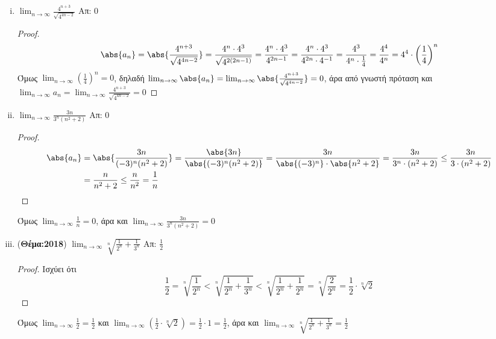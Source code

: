 \begin{enumerate}
\begin{enumerate}[i)]
            \item $ \lim_{n \to \infty} \frac{4^{n+3}}{\sqrt{4^{4n-2}}} $ \hfill Απ: 0  
                \begin{proof}
                    \[
                        \abs{a_{n}} = \abs{\frac{4^{n+3}}{\sqrt{4^{4n-2}}}} = 
                        \frac{4^{n}\cdot 4^{3}}{\sqrt{4^{2(2n-1)}}} = 
                        \frac{4^{n} \cdot 4^{3}}{4^{2n-1}} = 
                        \frac{4^{n}\cdot 4^{3}}{4^{2n}\cdot 4^{-1}} = 
                        \frac{4^{3}}{4^{n}\cdot 
                        \frac{1}{4}} = \frac{4^{4}}{4^{n}} = 4^{4}\cdot 
                        \left(\frac{1}{4} \right) ^{n}
                    \] 
                    Όμως $ \lim_{n \to \infty} \left(\frac{1}{4}\right)^{n} = 0  $, 
                    δηλαδή $ \lim_{n \to \infty} \abs{a_{n}} = \lim_{n \to \infty}
                    \abs{\frac{4^{n+3}}{\sqrt{4^{4n-2}}}} = 0 $, άρα από γνωστή 
                    πρόταση και $ \lim_{n \to \infty} a_{n} =  \lim_{n \to \infty} 
                    \frac{4^{n+3}}{\sqrt{4^{4n-2}}} = 0 $ 
                \end{proof}

            \item $ \lim_{n \to \infty} \frac{3n}{3^{n}(n^{2}+2)} $ \hfill Απ: 0  
                \begin{proof}
                    \begin{align*}
                        \abs{a_{n}} 
               &= \abs{\frac{3n}{(-3)^{n}(n^{2}+2)}} =
               \frac{\abs{3n}}{\abs{(-3)^{n}(n^{2}+2)}} = \frac{3n}{\abs{(-3)^{n}} \cdot
               \abs{n^{2}+2} } = \frac{3n}{3^{n}\cdot (n^{2}+2)} \leq 
               \frac{3n}{3\cdot (n^{2}+2)} \\ 
               &= \frac{n}{n^{2}+2} \leq \frac{n}{n^{2}} = \frac{1}{n} 
                    \end{align*} 
                \end{proof}
                Όμως $ \lim_{n \to \infty} \frac{1}{n} = 0 $, άρα και 
                $ \lim_{n \to \infty} \frac{3n}{3^{n}(n^{2}+2)} = 0 $

            \item ({\bfseries Θέμα:2018}) $ \lim_{n \to \infty} 
                \sqrt[n]{\frac{1}{2^{n}}+ \frac{1}{3^{n}}} $ 
                \hfill Απ: $ \frac{1}{2} $ 
                \begin{proof}
                    Ισχύει ότι 
                    \[
                        \frac{1}{2} = \sqrt[n]{\frac{1}{2^{n}}} < 
                        \sqrt[n]{\frac{1}{2^{n}} + \frac{1}{3^{n}} } < 
                        \sqrt[n]{\frac{1}{2^{n}} + \frac{1}{2^{n}}} = 
                        \sqrt[n]{\frac{2}{2^{n}}} = \frac{1}{2} \cdot \sqrt[n]{2} 
                    \] 
                \end{proof}
                Όμως $ \lim_{n \to \infty} \frac{1}{2} = \frac{1}{2} $ και 
                $ \lim_{n \to \infty} \left(\frac{1}{2} \cdot \sqrt[n]{2}\right) = 
                \frac{1}{2} \cdot 1 = \frac{1}{2} $, άρα και 
                $ \lim_{n \to \infty} \sqrt[n]{\frac{1}{2^{n}} + \frac{1}{3^{n}}} = 
                \frac{1}{2}  $


\end{enumerate}
\end{enumerate}
